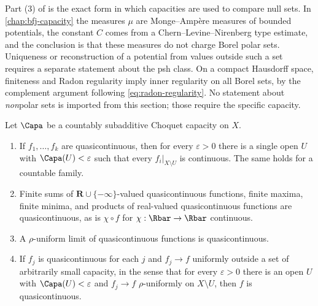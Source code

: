 \begin{remark}
\label{rem:capacity-interface}
Part (3) of  is the exact form in which
capacities are used to compare null sets.  In \cref{chap:bfj-capacity} the
measures $\mu$ are Monge--Amp\`ere measures of bounded potentials, the
constant $C$ comes from a Chern--Levine--Nirenberg type estimate, and the
conclusion is that these measures do not charge Borel polar sets.
Uniqueness or reconstruction of a potential from values outside such a set
requires a separate statement about the psh class.  On a compact Hausdorff
space, finiteness and Radon regularity imply inner regularity on all Borel
sets, by the complement argument following \eqref{eq:radon-regularity}.
No statement about \emph{non}polar sets is
imported from this section; those require the specific capacity.
\end{remark}

\begin{proposition}
\label{prop:quasicontinuity-calculus}
Let $\Capa$ be a countably subadditive Choquet capacity on $X$.
\begin{enumerate}
\item If $f_1,\dots,f_k$ are quasicontinuous, then for every $\varepsilon>0$
  there is a single open $U$ with $\Capa(U)<\varepsilon$ such that every
  $f_i|_{X\setminus U}$ is continuous.  The same holds for a countable family.
\item Finite sums of $\mathbf R\cup\{-\infty\}$-valued
  quasicontinuous functions, finite maxima, finite minima, and products of
  real-valued quasicontinuous functions are quasicontinuous, as is
  $\chi\circ f$ for $\chi:\Rbar\to\Rbar$ continuous.
\item A $\rho$-uniform limit of quasicontinuous functions is
  quasicontinuous.
\item If $f_j$ is quasicontinuous for each $j$ and $f_j\to f$ uniformly
  outside a set of arbitrarily small capacity, in the sense that for every
  $\varepsilon>0$ there is an open $U$ with $\Capa(U)<\varepsilon$ and
  $f_j\to f$ $\rho$-uniformly on $X\setminus U$, then $f$ is
  quasicontinuous.
\end{enumerate}
\par
\end{proposition}

